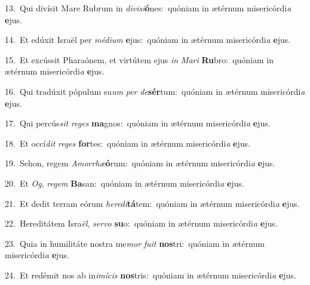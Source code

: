 {\numbfont\textcolor{\numbcolor}{13.}}~Qui divísit Mare Rubrum in \textit{di}\-\textit{vi}\textit{si}\textbf{ó}nes:~\star quóniam in ætérnum misericórdi\textit{a} \textbf{e}\-jus.\par
{\numbfont\textcolor{\numbcolor}{14.}}~Et edúxit Israël per \textit{mé}\-\textit{di}\textit{um} \textbf{e}\-jus:~\star quóniam in ætérnum misericórdi\textit{a} \textbf{e}\-jus.\par
{\numbfont\textcolor{\numbcolor}{15.}}~Et excússit Pharaónem, et virtútem ejus \textit{in} \textit{Ma}\-\textit{ri} \textbf{Ru}\-bro:~\star quóniam in ætérnum misericórdi\textit{a} \textbf{e}\-jus.\par
{\numbfont\textcolor{\numbcolor}{16.}}~Qui tradúxit pópulum su\textit{um} \textit{per} \textit{de}\-\textbf{sér}tum:~\star quóniam in ætérnum misericórdi\textit{a} \textbf{e}\-jus.\par
{\numbfont\textcolor{\numbcolor}{17.}}~Qui percús\textit{sit} \textit{re}\-\textit{ges} \textbf{ma}\-gnos:~\star quóniam in ætérnum misericórdi\textit{a} \textbf{e}\-jus.\par
{\numbfont\textcolor{\numbcolor}{18.}}~Et occí\textit{dit} \textit{re}\-\textit{ges} \textbf{for}\-tes:~\star quóniam in ætérnum misericórdi\textit{a} \textbf{e}\-jus.\par
{\numbfont\textcolor{\numbcolor}{19.}}~Sehon, regem \textit{A}\-\textit{mor}\textit{rhæ}\textbf{ó}rum:~\star quóniam in ætérnum misericórdi\textit{a} \textbf{e}\-jus.\par
{\numbfont\textcolor{\numbcolor}{20.}}~Et \textit{Og}\-, \textit{re}\-\textit{gem} \textbf{Ba}\-san:~\star quóniam in ætérnum misericórdi\textit{a} \textbf{e}\-jus.\par
{\numbfont\textcolor{\numbcolor}{21.}}~Et dedit terram eórum \textit{he}\-\textit{re}\textit{di}\textbf{tá}tem:~\star quóniam in ætérnum misericórdi\textit{a} \textbf{e}\-jus.\par
{\numbfont\textcolor{\numbcolor}{22.}}~Hereditátem Isra\-\textit{ël}\-, \textit{ser}\-\textit{vo} \textbf{su}\-o:~\star quóniam in ætérnum misericórdi\textit{a} \textbf{e}\-jus.\par
{\numbfont\textcolor{\numbcolor}{23.}}~Quia in humilitáte nostra me\textit{mor} \textit{fu}\-\textit{it} \textbf{nos}\-tri:~\star quóniam in ætérnum misericórdi\textit{a} \textbf{e}\-jus.\par
{\numbfont\textcolor{\numbcolor}{24.}}~Et redémit nos ab in\-\textit{i}\-\textit{mí}\textit{cis} \textbf{nos}\-tris:~\star quóniam in ætérnum misericórdi\textit{a} \textbf{e}\-jus.\par
